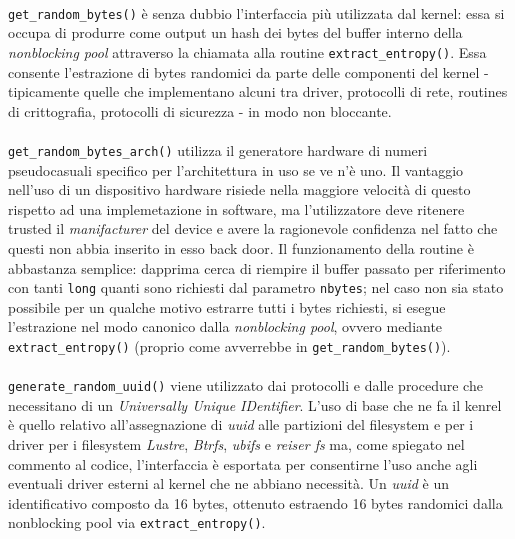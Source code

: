\documentclass{article}
\begin{document}
 \paragraph{}\verb+get_random_bytes()+ è senza dubbio l'interfaccia più
 utilizzata dal kernel: essa si occupa di produrre come output un hash dei bytes
 del buffer interno della \emph{nonblocking pool} attraverso la chiamata alla routine
 \verb+extract_entropy()+. Essa consente l'estrazione di bytes randomici da
 parte delle componenti del kernel - tipicamente quelle che implementano
 alcuni tra driver, protocolli di rete, routines di crittografia, protocolli di
 sicurezza - in modo non bloccante.
 
 \paragraph{}\verb+get_random_bytes_arch()+ utilizza il generatore hardware di
 numeri pseudocasuali specifico per l'architettura in uso se ve n'è uno. Il
 vantaggio nell'uso di un dispositivo hardware risiede nella maggiore velocità
 di questo rispetto ad una implemetazione in software, ma l'utilizzatore deve
 ritenere trusted il \emph{manifacturer} del device e avere la ragionevole
 confidenza nel fatto che questi non abbia inserito in esso back door. Il
 funzionamento della routine è abbastanza semplice: dapprima cerca di riempire
 il buffer passato per riferimento con tanti \verb+long+ quanti sono richiesti
 dal parametro \verb+nbytes+; nel caso non sia stato possibile per un qualche
 motivo estrarre tutti i bytes richiesti, si esegue l'estrazione nel modo
 canonico dalla \emph{nonblocking pool}, ovvero mediante
 \verb+extract_entropy()+ (proprio come avverrebbe in
 \verb+get_random_bytes()+).
 
 \paragraph{}\verb+generate_random_uuid()+ viene utilizzato dai protocolli e
 dalle procedure che necessitano di un \emph{Universally Unique IDentifier}.
 L'uso di base che ne fa il kenrel è quello relativo all'assegnazione di
 \emph{uuid} alle partizioni del filesystem e per i driver per i
 filesystem \emph{Lustre}, \emph{Btrfs}, \emph{ubifs} e \emph{reiser fs} ma,
 come spiegato nel commento al codice, l'interfaccia è esportata per
 consentirne l'uso anche agli eventuali driver esterni al kernel che ne abbiano
 necessità. Un \emph{uuid} è un identificativo composto da 16 bytes, ottenuto
 estraendo 16 bytes randomici dalla nonblocking pool via
 \verb+extract_entropy()+.
 
\end{document}
